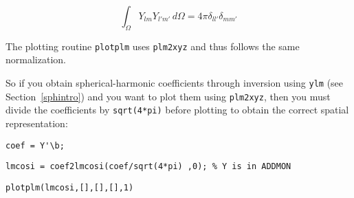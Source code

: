 \documentclass[11pt]{article}
\begin{document}
\[
\int_\Omega Y_{lm} Y_{l'm'} \, d\Omega = 4\pi \delta_{ll'}\delta_{mm'}
\]

The plotting routine \verb#plotplm# uses \verb#plm2xyz# and thus
follows the same normalization.

So if you obtain spherical-harmonic coefficients through inversion
using \verb#ylm# (see Section~\ref{sphintro}) and you want to plot
them using \verb#plm2xyz#, then you must divide the coefficients by
\verb#sqrt(4*pi)# before plotting to obtain the correct spatial
representation:

\quad \verb#coef = Y'\b;#

\quad \verb#lmcosi = coef2lmcosi(coef/sqrt(4*pi) ,0); % Y is in ADDMON#

\quad \verb#plotplm(lmcosi,[],[],[],1)#
\end{document}
